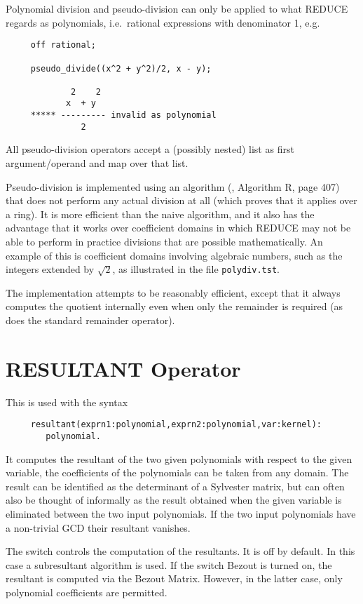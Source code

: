 Polynomial division and pseudo-division can only be applied to what
REDUCE regards as polynomials, i.e.\ rational expressions with
denominator 1, e.g.
\begin{verbatim}
     off rational;

     pseudo_divide((x^2 + y^2)/2, x - y);

             2    2
            x  + y
     ***** --------- invalid as polynomial
               2
\end{verbatim}
All pseudo-division operators accept a (possibly nested) list as first
argument/operand and map over that list.

Pseudo-division is implemented using an algorithm (\cite{Knuth:TAoCP2}, Algorithm R, page 407) that does
not perform any actual division at all (which proves that it applies
over a ring).  It is more efficient than the naive algorithm, and it
also has the advantage that it works over coefficient domains in which
REDUCE may not be able to perform in practice divisions that are
possible mathematically.  An example of this is coefficient domains
involving algebraic numbers, such as the integers extended by
$\sqrt{2}$, as illustrated in the file \texttt{polydiv.tst}.

The implementation attempts to be reasonably efficient, except that it
always computes the quotient internally even when only the remainder
is required (as does the standard remainder operator).

\section{RESULTANT Operator}
\hypertarget{operator:RESULTANT}{}
\hypertarget{switch:BEZOUT}{}

This is used with the syntax
\begin{verbatim}
     resultant(exprn1:polynomial,exprn2:polynomial,var:kernel):
        polynomial.
\end{verbatim}
It computes the resultant of the two given polynomials with respect to the
given variable, the coefficients of the polynomials can be taken from any
domain. The result can be identified as the determinant of a
Sylvester matrix, but can often also be thought of informally as the
result obtained when the given variable is eliminated between the two input
polynomials. If the two input polynomials have a non-trivial GCD their
resultant vanishes.

The switch  controls the computation of the
resultants. It is off by default. In this case a subresultant algorithm
is used. If the switch Bezout is turned on, the resultant is computed via
the Bezout Matrix. However, in the latter case, only polynomial coefficients
are permitted.

